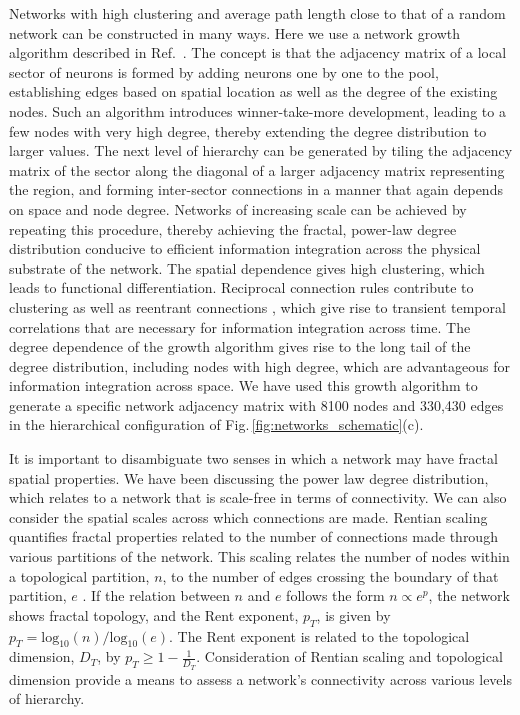 \documentclass[twocolumn]{article}
\newcommand{\onlinecite}[1]{\hspace{-1 ex} \nocite{#1}\citenum{#1}}
\begin{document}
Networks with high clustering and average path length close to that of a random network can be constructed in many ways. Here we use a network growth algorithm described in Ref.\,\onlinecite{sh2018e}. The concept is that the adjacency matrix of a local sector of neurons is formed by adding neurons one by one to the pool, establishing edges based on spatial location as well as the degree of the existing nodes. Such an algorithm introduces winner-take-more development, leading to a few nodes with very high degree, thereby extending the degree distribution to larger values. The next level of hierarchy can be generated by tiling the adjacency matrix of the sector along the diagonal of a larger adjacency matrix representing the region, and forming inter-sector connections in a manner that again depends on space and node degree. Networks of increasing scale can be achieved by repeating this procedure, thereby achieving the fractal, power-law degree distribution conducive to efficient information integration across the physical substrate of the network. The spatial dependence gives high clustering, which leads to functional differentiation. Reciprocal connection rules contribute to clustering as well as reentrant connections \cite{spto2000}, which give rise to transient temporal correlations that are necessary for information integration across time. The degree dependence of the growth algorithm gives rise to the long tail of the degree distribution, including nodes with high degree, which are advantageous for information integration across space. We have used this growth algorithm to generate a specific network adjacency matrix with 8100 nodes and 330,430 edges in the hierarchical configuration of Fig.\,\ref{fig:networks_schematic}(c). 

It is important to disambiguate two senses in which a network may have fractal spatial properties. We have been discussing the power law degree distribution, which relates to a network that is scale-free in terms of connectivity. We can also consider the spatial scales across which connections are made. Rentian scaling quantifies fractal properties related to the number of connections made through various partitions of the network. This scaling relates the number of nodes within a topological partition, $n$, to the number of edges crossing the boundary of that partition, $e$ \cite{bagr2010}. If the relation between $n$ and $e$ follows the form $n\propto e^p$, the network shows fractal topology, and the Rent exponent, $p_T$, is given by $p_T = \mathrm{log}_{10}(n)/\mathrm{log}_{10}(e)$. The Rent exponent is related to the topological dimension, $D_T$, by $p_T \ge 1-\frac{1}{D_T}$. Consideration of Rentian scaling and topological dimension provide a means to assess a network's connectivity across various levels of hierarchy. 
\end{document}
